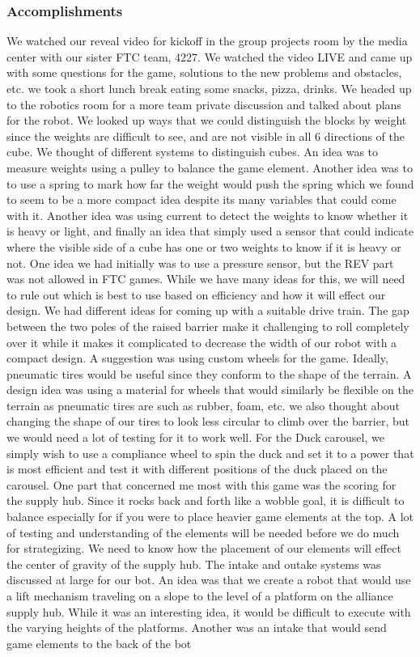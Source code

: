 \subsubsection*{Accomplishments}
We watched our reveal video for kickoff in the group projects room by the media center with our sister FTC team, 4227. We watched the video LIVE and came up with some questions for the game, solutions to the new problems and obstacles, etc.  we took a short lunch break eating some snacks, pizza, drinks. We headed up to the robotics room for a more team private discussion and talked about plans for the robot. We looked up ways that we could distinguish the blocks by weight since the weights are difficult to see, and are not visible in all 6 directions of the cube. We thought of different systems to distinguish cubes. An idea was to measure weights using a pulley to balance the game element. Another idea was to to use a spring to mark how far the weight would push the spring which we found to seem to be a more compact idea despite its many variables that could come with it. Another idea was using current to detect the weights to know whether it is heavy or light, and finally an idea that simply used a sensor that could indicate where the visible side of a cube has one or two weights to know if it is heavy or not. One idea we had initially was to use a pressure sensor, but the REV part was not allowed in FTC games. While we have many ideas for this, we will need to rule out which is best to use based on efficiency and how it will effect our design. We had different ideas for  coming up with a suitable drive train. The gap between the two poles of the raised barrier make it challenging to roll completely over it while it makes it complicated to decrease the width of our robot with a compact design. A suggestion was using custom wheels for the game. Ideally, pneumatic tires would be useful since they conform to the shape of the terrain. A design idea was using a material for wheels that would similarly be flexible on the terrain as pneumatic tires are such as rubber, foam, etc. we also thought about changing the shape of our tires to look less circular to climb over the barrier, but we would need a lot of testing for it to work well. For the Duck carousel, we simply wish to use a compliance wheel to spin the duck and set it to a power that is most efficient and test it with different positions of the duck placed on the carousel. One part that concerned me most with this game was the scoring for the supply hub. Since it rocks back and forth like a wobble goal, it is difficult to balance especially for if you were to place heavier game elements at the top. A lot of testing and understanding of the elements will be needed before we do much for strategizing. We need to know how the placement of our elements will effect the center of gravity of the supply hub. The intake and outake systems was discussed at large for our bot. An idea was that we create a robot that would use a lift mechanism traveling on a slope to the level of a platform on the alliance supply hub. While it was an interesting idea, it would be difficult to execute with the varying heights of the platforms. Another was an intake that would send game elements to the back of the bot 